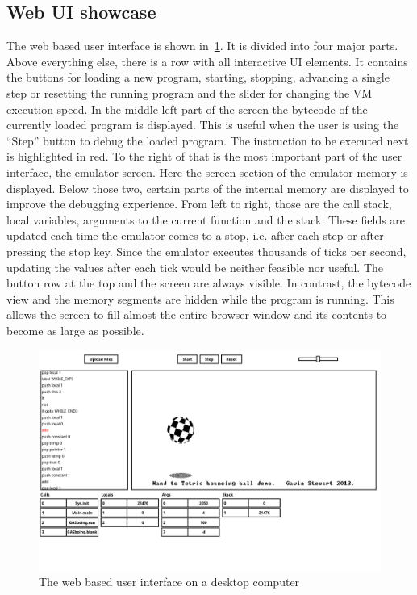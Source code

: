 \subsection{Web UI showcase} \label{ui-showcase}
The web based user interface is shown in~\cref{fig:ui-demo-desktop}. It is divided into four major parts.
Above everything else, there is a row with all interactive UI elements. It contains the buttons for loading a new program, starting, stopping, advancing a single step or resetting the running program and the slider for changing the VM execution speed.
In the middle left part of the screen the bytecode of the currently loaded program is displayed. This is useful when the user is using the ``Step'' button to debug the loaded program. The instruction to be executed next is highlighted in red.
To the right of that is the most important part of the user interface, the emulator screen.
Here the screen section of the emulator memory is displayed.
Below those two, certain parts of the internal memory are displayed to improve the debugging experience. From left to right, those are the call stack, local variables, arguments to the current function and the stack.
These fields are updated each time the emulator comes to a stop, i.e. after each step or after pressing the stop key. Since the emulator executes thousands of ticks per second, updating the values after each tick would be neither feasible nor useful.
The button row at the top and the screen are always visible.
In contrast, the bytecode view and the memory segments are hidden while the program is running. This allows the screen to fill almost the entire browser window and its contents to become as large as possible.
\begin{center}
  \begin{figure}[ht]
    \centering
    \includegraphics[width=12cm]{fig/ui-demo-desktop.png}
    \caption{The web based user interface on a desktop computer}%
    \label{fig:ui-demo-desktop}
  \end{figure}
\end{center}

